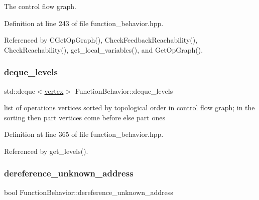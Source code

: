The control flow graph. 



Definition at line 243 of file function\+\_\+behavior.\+hpp.



Referenced by C\+Get\+Op\+Graph(), Check\+Feedback\+Reachability(), Check\+Reachability(), get\+\_\+local\+\_\+variables(), and Get\+Op\+Graph().

\mbox{\label{classFunctionBehavior_a96d78394bdc448fa466607c2a75392e7}} 
\subsubsection{\texorpdfstring{deque\+\_\+levels}{deque\_levels}}
{\footnotesize\ttfamily std\+::deque$<$\hyperlink{graph_8hpp_abefdcf0544e601805af44eca032cca14}{vertex}$>$ Function\+Behavior\+::deque\+\_\+levels\hspace{0.3cm}{\ttfamily [private]}}



list of operations vertices sorted by topological order in control flow graph; in the sorting then part vertices come before else part ones 



Definition at line 365 of file function\+\_\+behavior.\+hpp.



Referenced by get\+\_\+levels().

\mbox{\label{classFunctionBehavior_aafd6bd17fce8602e186da5c96b40d422}} 
\subsubsection{\texorpdfstring{dereference\+\_\+unknown\+\_\+address}{dereference\_unknown\_address}}
{\footnotesize\ttfamily bool Function\+Behavior\+::dereference\+\_\+unknown\+\_\+address\hspace{0.3cm}{\ttfamily [private]}}




